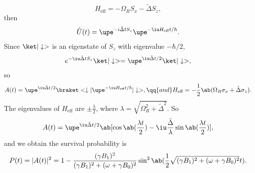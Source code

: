 \begin{solution}
\begin{enumext}[label = (\alph*)]
    \[
      H_{\text{eff}} = -\Omega_R S_x - \tilde{\Delta} S_z,
    \]
    then
    \[
      \hat U(t) = \upe^{-i\tilde{\Delta} t S_z} \upe^{-\iu H_{\text{eff}} t/\hbar}.
    \]
    Since $\ket|\downarrow>$ is an eigenstate of $S_z$ with eigenvalue $-\hbar/2$,
    \[
    e^{-\iu\tilde{\Delta} t S_z} \ket|\downarrow> = \upe^{\iu\tilde{\Delta} t/2} \ket|\downarrow>,
    \]
    so
    \[
    A(t) = \upe^{\iu\tilde{\Delta} t/2}
          \braket<\downarrow|\upe^{-\iu H_\text{eff} t/\hbar}|\downarrow>, \qq{and}
      H_\text{eff} = -\frac12 \ab(\Omega_R \sigma_x + \tilde{\Delta} \sigma_z).
    \]
    The eigenvalues of $H_{\text{eff}}$ are $\pm \frac{\lambda}{2}$, where $\lambda = \sqrt{\Omega_R^2 + \tilde{\Delta}^2}$. So
    \[
      A(t) = \upe^{\iu\tilde{\Delta} t/2}
              \ab[\cos\ab(\frac{\lambda t}{2})
            - \iu\frac{\tilde{\Delta}}{\lambda} \sin\ab(\frac{\lambda t}{2})],
    \]
    and we obtain the survival probability is
    \[
      P(t) = |A(t)|^2
    = 1 - \frac{(\gamma B_1)^2}{(\gamma B_1)^2 + (\omega + \gamma B_0)^2}
      \sin^2\ab(\frac12 \sqrt{(\gamma B_1)^2 + (\omega + \gamma B_0)^2} t).
    \]
  \end{enumext}
\end{solution}

\newpage

